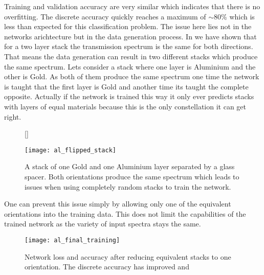 Training and validation accuracy are very similar which indicates that there is no overfitting. The discrete accuracy quickly reaches a maximum of $\sim 80\%$
which is less than expected for this classification problem. The issue here lies not in the networks arichtecture but in the data generation process. In 
we have shown that for a two layer stack the transmission spectrum is the same for both directions. That means the data generation can result in two different stacks which produce the same spectrum. Lets consider a stack where one layer is Aluminium and the other is Gold. As both of them produce the same spectrum one time the network is taught that the first layer is Gold and another time its taught the complete opposite. Actually if the network is trained this way it only ever predicts stacks with layers of equal materials because this is the only constellation it can get right.
\\

\begin{figure}[H]
    [\FBwidth]
    {\caption{A stack of one Gold and one Aluminium layer separated by a glass spacer. Both orientations produce the same spectrum which leads to issues when using completely random stacks to train the network.}
    \label{fig:test}}
    {\texttt{[image: al\_flipped\_stack]}}
\end{figure}


\newpage
One can prevent this issue simply by allowing only one of the equivalent orientations into the training data. This does not limit the capabilities of the trained network as the variety of input spectra stays the same.

\begin{figure}[H]
    \centering
    \texttt{[image: al\_final\_training]}
    \caption{Network loss and accuracy after reducing equivalent stacks to one orientation. The discrete accuracy has improved and }
    \label{}
\end{figure}
